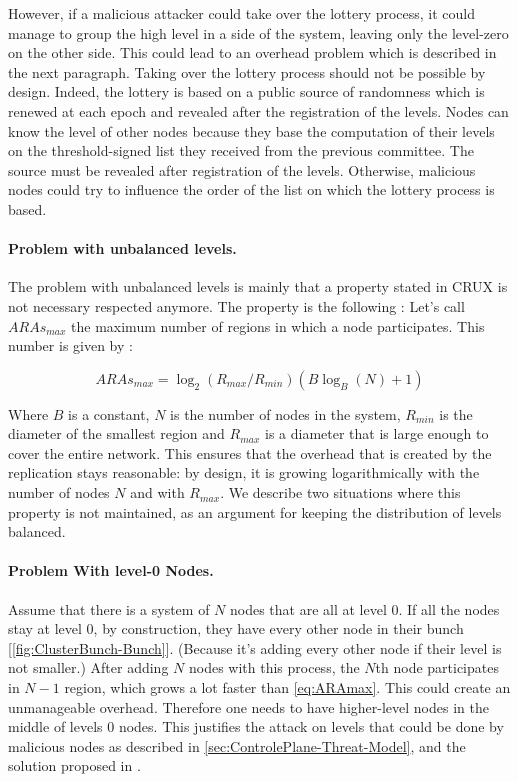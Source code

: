 \documentclass[a4paper,11pt,twoside=semi,openright]{report}
\begin{document}
However, if a malicious attacker could take over the lottery process, it could
manage to group the high level in a side of the system, leaving only the
level-zero on the other side. This could lead to an overhead problem which is
described in the next paragraph.  Taking over the lottery process should not be
possible by design. Indeed, the lottery is based on a public source of
randomness which is renewed at each epoch and revealed after the registration
of the levels. Nodes can know the level of other nodes because they base the
computation of their levels on the threshold-signed list they received from the
previous committee. The source must be revealed after registration of the
levels. Otherwise, malicious nodes could try to influence the order of the list
on which the lottery process is based. 

\paragraph{Problem with unbalanced levels.} \label{app:unbalanced-levels}
The problem with unbalanced levels is mainly that a property stated in CRUX
\cite{Basescu2014} is not necessary respected anymore. The property is the
following : Let's call $ARAs_{max}$ the maximum number of regions in which a
node participates. This number is given by : 

\begin{equation} \label{eq:ARAmax}
ARAs_{max} = \log_2(R_{max}/R_{min}) (B \log_B(N)+1)
\end{equation}

Where $B$ is a constant, $N$ is the number of nodes in the system, $R_{min}$ is
the diameter of the smallest region and $R_{max}$ is a diameter that is large
enough to cover the entire network. This ensures that the overhead that is
created by the replication stays reasonable: by design, it is growing
logarithmically with the number of nodes $N$ and with $R_{max}$. We describe
two situations where this property is not maintained, as an argument for
keeping the distribution of levels balanced.

\paragraph{Problem With level-0 Nodes.} \label{app:levels-zero}
Assume that there is a system of $N$ nodes that are all at level 0. If all the
nodes stay at level 0, by construction, they have every other node in their
bunch [\autoref{fig:ClusterBunch-Bunch}]. (Because it’s adding every other node
if their level is not smaller.) After adding $N$ nodes with this process, the
$N$th node participates in $N-1$ region, which grows a lot faster than
\autoref{eq:ARAmax}. This could create an unmanageable overhead.  Therefore one
needs to have higher-level nodes in the middle of levels 0 nodes.  This
justifies the attack on levels that could be done by malicious nodes as
described in \autoref{sec:ControlePlane-Threat-Model}, and the solution
proposed in .
\end{document}
